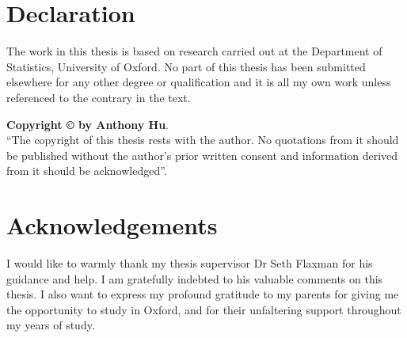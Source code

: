 

\chapter*{Declaration}
The work in this thesis is based on research carried out at the Department of Statistics, University of Oxford. No part of this thesis has been submitted elsewhere for any other degree or qualification and it is all my own work unless referenced to the contrary in the text.


\vfill
\noindent \textbf{Copyright \copyright{} by Anthony Hu}.\\
``The copyright of this thesis rests with the author.  No quotations
from it should be published without the author's prior written consent
and information derived from it should be acknowledged''.



\chapter*{Acknowledgements}
I would like to warmly thank my thesis supervisor Dr Seth Flaxman for his guidance and help. I am gratefully indebted to his valuable comments on this thesis.
I also want to express my profound gratitude to my parents for giving me the opportunity to study in Oxford, and for their unfaltering support throughout my years of study. 

